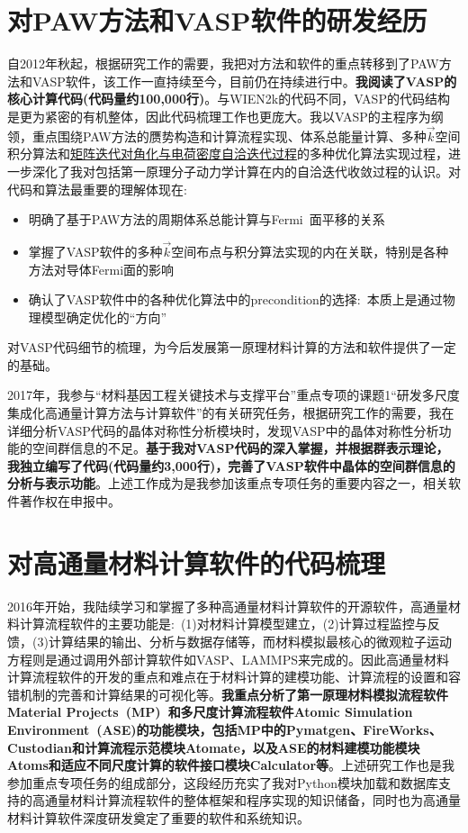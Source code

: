 \documentclass{article}      %
\newcommand{\upcite}[1]{\hspace{0ex}\textsuperscript{\cite{#1}}} %
\begin{document}
\section{对{\rm PAW}方法和{\rm VASP}软件的研发经历}
自2012年秋起，根据研究工作的需要，我把对方法和软件的重点转移到了\textrm{PAW}方法和\textrm{VASP}软件，该工作一直持续至今，目前仍在持续进行中。\textbf{我阅读了\textrm{VASP}的核心计算代码(代码量约100,000行)}。与\textrm{WIEN2k}的代码不同，\textrm{VASP}的代码结构是更为紧密的有机整体，因此代码梳理工作也更庞大。我以\textrm{VASP}的主程序为纲领，重点围绕\textrm{PAW}方法的赝势构造\upcite{PAW-dataset}和计算流程实现、体系总能量计算、多种$\vec k$空间积分算法和\underline{矩阵迭代对角化与电荷密度自洽迭代过程}的多种优化算法实现过程，进一步深化了我对包括第一原理分子动力学计算在内的自洽迭代收敛过程的认识。对代码和算法最重要的理解体现在:~
\begin{itemize}
	\item 明确了基于\textrm{PAW}方法的周期体系总能计算与\textrm{Fermi~}面平移的关系
	\item 掌握了\textrm{VASP}软件的多种$\vec k$空间布点与积分算法实现的内在关联，特别是各种方法对导体\textrm{Fermi}面的影响
	\item 确认了\textrm{VASP}软件中的各种优化算法中的\textrm{precondition}的选择:~本质上是通过物理模型确定优化的“方向”
\end{itemize}
对\textrm{VASP}代码细节的梳理，为今后发展第一原理材料计算的方法和软件提供了一定的基础。

2017年，我参与“材料基因工程关键技术与支撑平台”重点专项的课题1“研发多尺度集成化高通量计算方法与计算软件”的有关研究任务，根据研究工作的需要，我在详细分析\textrm{VASP}代码的晶体对称性分析模块时，发现\textrm{VASP}中的晶体对称性分析功能的空间群信息的不足。\textbf{基于我对\textrm{VASP}代码的深入掌握，并根据群表示理论，我独立编写了代码(代码量约3,000行)，完善了\textrm{VASP}软件中晶体的空间群信息的分析与表示功能}。上述工作成为是我参加该重点专项任务的重要内容之一，相关软件著作权在申报中。

\section{对高通量材料计算软件的代码梳理}
2016年开始，我陆续学习和掌握了多种高通量材料计算软件的开源软件，高通量材料计算流程软件的主要功能是:~(1)对材料计算模型建立，(2)计算过程监控与反馈，(3)计算结果的输出、分析与数据存储等，而材料模拟最核心的微观粒子运动方程则是通过调用外部计算软件如\textrm{VASP}、\textrm{LAMMPS}来完成的。因此高通量材料计算流程软件的开发的重点和难点在于材料计算的建模功能、计算流程的设置和容错机制的完善和计算结果的可视化等。\textbf{我重点分析了第一原理材料模拟流程软件\textrm{Material Projects~(MP)~}和多尺度计算流程软件\textrm{Atomic Simulation Environment~(ASE)}的功能模块，包括\textrm{MP}中的\textrm{Pymatgen}、\textrm{FireWorks}、\textrm{Custodian}和计算流程示范模块\textrm{Atomate}，以及\textrm{ASE}的材料建模功能模块\textrm{Atoms}和适应不同尺度计算的软件接口模块\textrm{Calculator}等}。上述研究工作也是我参加重点专项任务的组成部分，这段经历充实了我对\textrm{Python}模块加载和数据库支持的高通量材料计算流程软件的整体框架和程序实现的知识储备，同时也为高通量材料计算软件深度研发奠定了重要的软件和系统知识。
\end{document}
